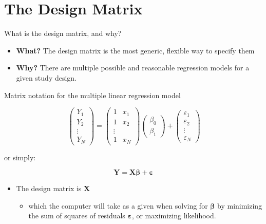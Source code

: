 \documentclass[
  ignorenonframetext,
]{beamer}
\providecommand{\tightlist}{%
  \setlength{\itemsep}{0pt}\setlength{\parskip}{0pt}}
\begin{document}
\hypertarget{the-design-matrix}{%
\section{The Design Matrix}\label{the-design-matrix}}

\begin{frame}{What is the design matrix, and why?}
\protect\hypertarget{what-is-the-design-matrix-and-why}{}

\begin{itemize}
\tightlist
\item
  \textbf{What?} The design matrix is the most generic, flexible way to
  specify them
\item
  \textbf{Why?} There are multiple possible and reasonable regression
  models for a given study design.
\end{itemize}

\end{frame}

\begin{frame}{Matrix notation for the multiple linear regression model}
\protect\hypertarget{matrix-notation-for-the-multiple-linear-regression-model}{}

\[
\,
\begin{pmatrix}
Y_1\\
Y_2\\
\vdots\\
Y_N
\end{pmatrix} = 
\begin{pmatrix}
1&x_1\\
1&x_2\\
\vdots\\
1&x_N
\end{pmatrix}
\begin{pmatrix}
\beta_0\\
\beta_1
\end{pmatrix} +
\begin{pmatrix}
\varepsilon_1\\
\varepsilon_2\\
\vdots\\
\varepsilon_N
\end{pmatrix}
\]

or simply:

\[
\mathbf{Y}=\mathbf{X}\boldsymbol{\beta}+\boldsymbol{\varepsilon}
\]

\begin{itemize}
\tightlist
\item
  The design matrix is \(\mathbf{X}\)

  \begin{itemize}
  \tightlist
  \item
    which the computer will take as a given when solving for
    \(\boldsymbol{\beta}\) by minimizing the sum of squares of residuals
    \(\boldsymbol{\varepsilon}\), or maximizing likelihood.
  \end{itemize}
\end{itemize}

\end{frame}
\end{document}
